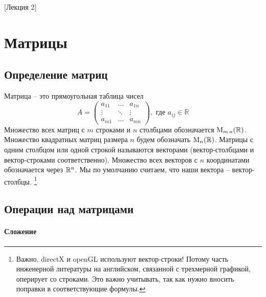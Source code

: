 [Лекция 2]


\newpage

\section{Матрицы}

\subsection{Определение матриц}

Матрица -- это прямоугольная таблица чисел
\[
A=
\begin{pmatrix}
a_{11}&\ldots& a_{1n}\\
\vdots&\ddots&\vdots\\
a_{m1}& \ldots &a_{mn}
\end{pmatrix},\text{ где } a_{ij}\in \mathbb R
\]
Множество всех матриц с $m$ строками и $n$ столбцами обозначается $\operatorname{M}_{m\,n}(\mathbb R)$.
Множество квадратных матриц размера $n$ будем обозначать $\operatorname{M}_{n}(\mathbb R)$.
Матрицы с одним столбцом или одной строкой называются векторами (вектор-столбцами и вектор-строками соответственно).
Множество всех векторов с $n$ координатами обозначается через $\mathbb R^{n}$.
Мы по умолчанию считаем, что наши вектора -- вектор-столбцы.%
\footnote{Важно, directX и openGL используют вектор-строки!
Потому часть инженерной литературы на английском, связанной с трехмерной графикой, оперирует со строками.
Это важно учитывать, так как нужно вносить поправки в соответствующие формулы.}

\subsection{Операции над матрицами}
\label{section::MatrixOps}

\paragraph{Сложение}

